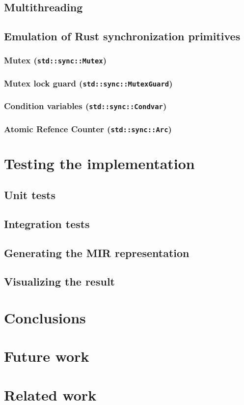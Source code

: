 \documentclass[12pt, oneside]{book}
\begin{document}
\section{Multithreading}
\section{Emulation of Rust synchronization primitives}

\subsection{Mutex (\texttt{std::sync::Mutex})}
\subsection{Mutex lock guard (\texttt{std::sync::MutexGuard})}
\subsection{Condition variables (\texttt{std::sync::Condvar})}
\subsection{Atomic Refence Counter (\texttt{std::sync::Arc})}

\bigskip

\chapter{Testing the implementation}

\section{Unit tests}
\section{Integration tests}
\section{Generating the MIR representation}
\section{Visualizing the result}

\bigskip

\chapter{Conclusions}

\bigskip

\chapter{Future work}

\bigskip

\chapter{Related work}

\bigskip


\end{document}
